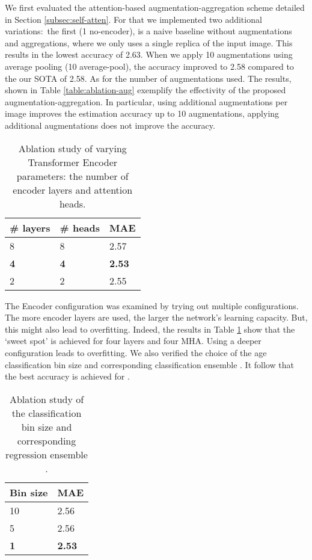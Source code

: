 \documentclass[10pt,twocolumn,letterpaper]{article}
\begin{document}
We first evaluated the attention-based augmentation-aggregation scheme
detailed in Section \ref{subsec:self-atten}. For that we implemented two
additional variations:\ the first (1 no-encoder), is a naive baseline
without augmentations and aggregations, where we only uses a single replica
of the input image. This results in the lowest accuracy of 2.63. When we
apply 10 augmentations using average pooling (10 average-pool), the accuracy
improved to 2.58 compared to the our SOTA of 2.58. As for the number of
augmentations used. The results, shown in Table \ref{table:ablation-aug}
exemplify the effectivity of the proposed augmentation-aggregation. In
particular, using additional augmentations per image improves the estimation
accuracy up to 10 augmentations, applying additional augmentations does not
improve the accuracy.
\begin{table}[tbh]
\begin{center}
\centering \begin{tabular}{l|l|l}
\hline
\# layers & \# heads & MAE \\ \hline\hline
8 & 8 & 2.57 \\
\textbf{4} & \textbf{4} & \textbf{2.53} \\
2 & 2 & 2.55 \\ \hline
\end{tabular}\end{center}
\caption{Ablation study of varying Transformer Encoder parameters: the
number of encoder layers and attention heads.}
\label{tab:encoder_size}
\end{table}

The Encoder configuration was examined by trying out multiple
configurations. The more encoder layers are used, the larger the network's
learning capacity. But, this might also lead to overfitting. Indeed, the
results in Table \ref{tab:encoder_size} show that the `sweet spot' is
achieved for four layers and four MHA. Using a deeper configuration leads to
overfitting. We also verified the choice of the age classification bin size
and corresponding classification ensemble . It follow that the best accuracy is
achieved for .
\begin{table}[tbh]
\begin{center}
\centering \begin{tabular}{l|l}
\hline
Bin size & MAE \\ \hline\hline
10 & 2.56 \\
5 & 2.56 \\
\textbf{1} & \textbf{2.53 } \\ \hline
\end{tabular}\end{center}
\caption{Ablation study of the classification bin size and corresponding
regression ensemble .}
\label{tab:bin_size}
\end{table}
\end{document}
